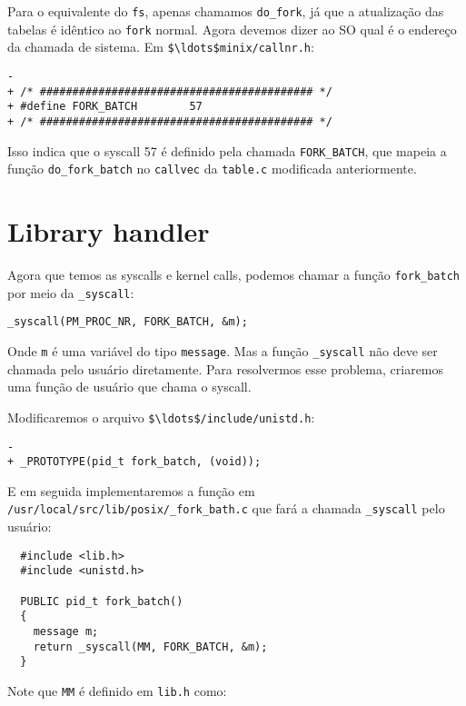 \documentclass{amsart}
\theoremstyle{plain}
\newcommand{\code}[1]{\lstinline[mathescape=true]{#1}}
\newcommand{\mcode}[1]{\lstinline[mathescape]!#1!}
\begin{document}
Para o equivalente do \code{fs}, apenas chamamos \code{do_fork}, já que a atualização das tabelas
é idêntico ao \code{fork} normal. Agora devemos dizer ao SO qual é o endereço da chamada de
sistema. Em \mcode{$\ldots$minix/callnr.h}:

\begin{lstlisting}[frame=leftline,mathescape=true,style=nonumbers]
-
+ /* ########################################## */
+ #define FORK_BATCH        57
+ /* ########################################## */
\end{lstlisting}

Isso indica que o syscall 57 é definido pela chamada \code{FORK_BATCH}, que mapeia a função
\code{do_fork_batch} no \code{callvec} da \code{table.c} modificada anteriormente.

\section{Library handler}

Agora que temos as syscalls e kernel calls, podemos chamar a função \code{fork_batch} por meio
da \code{_syscall}:

\begin{lstlisting}[frame=leftline,mathescape=true,style=nonumbers]
_syscall(PM_PROC_NR, FORK_BATCH, &m);
\end{lstlisting}

Onde \code{m} é uma variável do tipo \code{message}. Mas a função \code{_syscall} não deve ser
chamada pelo usuário diretamente. Para resolvermos esse problema, criaremos uma função de usuário
que chama o syscall.

Modificaremos o arquivo \mcode{$\ldots$/include/unistd.h}:

\begin{lstlisting}[frame=leftline,mathescape=true,style=nonumbers]
-
+ _PROTOTYPE(pid_t fork_batch, (void));
\end{lstlisting}

E em seguida implementaremos a função em \code{/usr/local/src/lib/posix/_fork_bath.c} que fará a
chamada \code{_syscall} pelo usuário:

\begin{verbatim}
  #include <lib.h>
  #include <unistd.h>

  PUBLIC pid_t fork_batch()
  {
    message m;
    return _syscall(MM, FORK_BATCH, &m);
  }
\end{verbatim}

Note que \code{MM} é definido em \code{lib.h} como:
\end{document}
